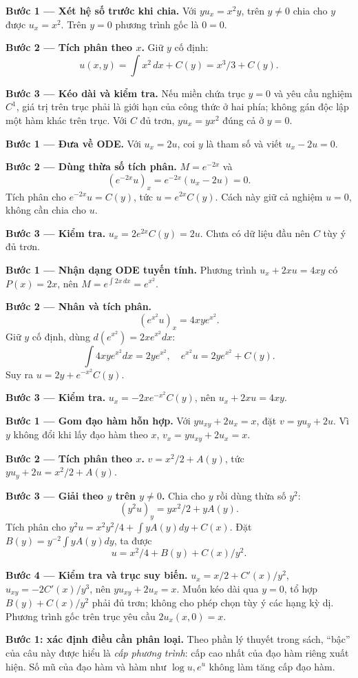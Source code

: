 \textbf{Bước 1 — Xét hệ số trước khi chia.} Với $yu_x=x^2y$, trên $y\ne0$ chia cho $y$ được $u_x=x^2$. Trên $y=0$ phương trình gốc là $0=0$.

\textbf{Bước 2 — Tích phân theo $x$.} Giữ $y$ cố định:
\[u(x,y)=\int x^2\,dx+C(y)=x^3/3+C(y).\]

\textbf{Bước 3 — Kéo dài và kiểm tra.} Nếu miền chứa trục $y=0$ và yêu cầu nghiệm $C^1$, giá trị trên trục phải là giới hạn của công thức ở hai phía; không gán độc lập một hàm khác trên trục. Với $C$ đủ trơn, $yu_x=yx^2$ đúng cả ở $y=0$.

\textbf{Bước 1 — Đưa về ODE.} Với $u_x=2u$, coi $y$ là tham số và viết $u_x-2u=0$.

\textbf{Bước 2 — Dùng thừa số tích phân.} $M=e^{-2x}$ và
\[(e^{-2x}u)_x=e^{-2x}(u_x-2u)=0.\]
Tích phân cho $e^{-2x}u=C(y)$, tức $u=e^{2x}C(y)$. Cách này giữ cả nghiệm $u=0$, không cần chia cho $u$.

\textbf{Bước 3 — Kiểm tra.} $u_x=2e^{2x}C(y)=2u$. Chưa có dữ liệu đầu nên $C$ tùy ý đủ trơn.

\textbf{Bước 1 — Nhận dạng ODE tuyến tính.} Phương trình $u_x+2xu=4xy$ có $P(x)=2x$, nên $M=e^{\int2x\,dx}=e^{x^2}$.

\textbf{Bước 2 — Nhân và tích phân.}
\[(e^{x^2}u)_x=4xy e^{x^2}.\]
Giữ $y$ cố định, dùng $d(e^{x^2})=2xe^{x^2}dx$:
\[\int4xy e^{x^2}dx=2y e^{x^2},\quad e^{x^2}u=2y e^{x^2}+C(y).\]
Suy ra $u=2y+e^{-x^2}C(y)$.

\textbf{Bước 3 — Kiểm tra.} $u_x=-2xe^{-x^2}C(y)$, nên $u_x+2xu=4xy$.

\textbf{Bước 1 — Gom đạo hàm hỗn hợp.} Với $yu_{xy}+2u_x=x$, đặt $v=yu_y+2u$. Vì $y$ không đổi khi lấy đạo hàm theo $x$, $v_x=yu_{xy}+2u_x=x$.

\textbf{Bước 2 — Tích phân theo $x$.} $v=x^2/2+A(y)$, tức $yu_y+2u=x^2/2+A(y)$.

\textbf{Bước 3 — Giải theo $y$ trên $y\ne0$.} Chia cho $y$ rồi dùng thừa số $y^2$:
\[(y^2u)_y=yx^2/2+yA(y).\]
Tích phân cho $y^2u=x^2y^2/4+\int yA(y)dy+C(x)$. Đặt $B(y)=y^{-2}\int yA(y)dy$, ta được
\[u=x^2/4+B(y)+C(x)/y^2.\]

\textbf{Bước 4 — Kiểm tra và trục suy biến.} $u_x=x/2+C'(x)/y^2$, $u_{xy}=-2C'(x)/y^3$, nên $yu_{xy}+2u_x=x$. Muốn kéo dài qua $y=0$, tổ hợp $B(y)+C(x)/y^2$ phải đủ trơn; không cho phép chọn tùy ý các hạng kỳ dị. Phương trình gốc trên trục yêu cầu $2u_x(x,0)=x$.

\textbf{Bước 1: xác định điều cần phân loại.} Theo phần lý thuyết trong sách, ``bậc'' của câu này được hiểu là \emph{cấp phương trình}: cấp cao nhất của đạo hàm riêng xuất hiện. Số mũ của đạo hàm và hàm như $\log u,e^u$ không làm tăng cấp đạo hàm.

